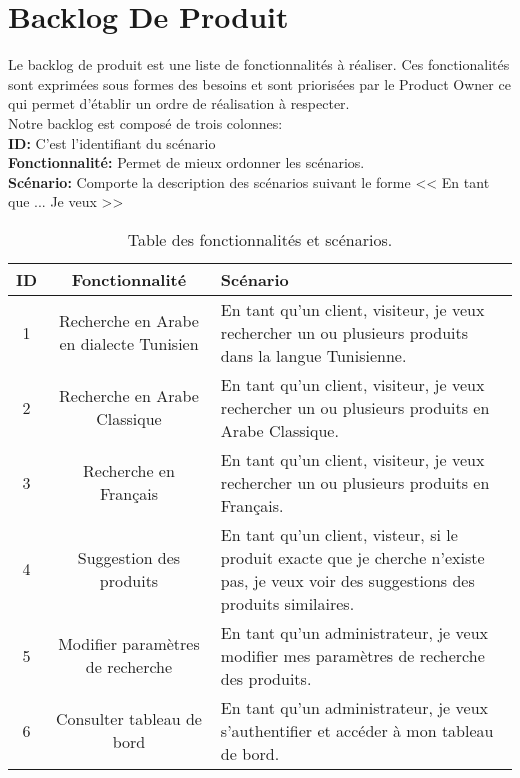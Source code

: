 \section{Backlog De Produit}
\noindent
\large
Le backlog de produit est une liste de fonctionnalités à réaliser. Ces fonctionalités sont exprimées sous formes des besoins et sont priorisées par le Product Owner ce qui permet d'établir un ordre de réalisation à respecter. \\
Notre backlog est composé de trois colonnes: \\
\textbf{ID: } C'est l'identifiant du scénario \\
\textbf{Fonctionnalité: } Permet de mieux ordonner les scénarios. \\
\textbf{Scénario: } Comporte la description des scénarios suivant le forme << En tant que ... Je veux >> \\

\begin{table}[H]
	\centering
	\begin{tabular}{|c|c|p{10cm}|}
		\hline
		\rowcolor{blue!20}
		\textbf{ID} & \textbf{Fonctionnalité}                 & \textbf{Scénario}                                                                                                                      \\ \hline
		1           & Recherche en Arabe en dialecte Tunisien & En tant qu'un client, visiteur, je veux rechercher un ou plusieurs produits dans la langue Tunisienne.                                 \\ \hline
		2           & Recherche en Arabe Classique            & En tant qu'un client, visiteur, je veux rechercher un ou plusieurs produits en Arabe Classique.                                        \\ \hline
		3           & Recherche en Français                   & En tant qu'un client, visiteur, je veux rechercher un ou plusieurs produits en Français.                                               \\ \hline
		4           & Suggestion des produits                 & En tant qu'un client, visteur, si le produit exacte que je cherche n'existe pas, je veux voir des suggestions des produits similaires. \\ \hline

		5           & Modifier paramètres de recherche                 & En tant qu'un administrateur, je veux modifier mes paramètres de recherche des produits. \\ \hline

		6           & Consulter tableau de bord               & En tant qu'un administrateur, je veux s'authentifier et accéder à mon tableau de bord.                                                 \\  \hline
	\end{tabular}
	\caption{Table des fonctionnalités et scénarios.}
\end{table}

